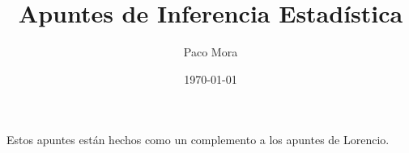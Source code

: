 \documentclass[openany]{book}
\title{Apuntes de Inferencia Estadística}
\author{Paco Mora}
\date{\today}
\begin{document}
\maketitle

\noindent Estos apuntes están hechos como un complemento a los apuntes de Lorencio.













\end{document}
